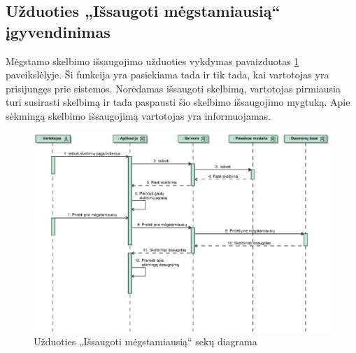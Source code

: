 \documentclass[12pt]{article}
\begin{document}
	\subsection{Užduoties „Išsaugoti mėgstamiausią“ įgyvendinimas}
	Mėgstamo skelbimo išsaugojimo užduoties vykdymas pavaizduotas \ref{SaveFavSeq} paveikslėlyje. Ši funkcija yra pasiekiama tada ir tik tada, kai vartotojas yra prisijungęs prie sistemos. Norėdamas išsaugoti skelbimą, vartotojas pirmiausia turi susirasti skelbimą ir tada  paspausti šio skelbimo išsaugojimo mygtuką. Apie sėkmingą skelbimo išsaugojimą vartotojas yra informuojamas.
	\begin{figure}[h]
		\begin{center}
			\includegraphics[width=\textwidth]{IssaugotiMegstamiausia.eps}
			\caption{Užduoties „Išsaugoti mėgstamiausią“ sekų diagrama\label{SaveFavSeq}}
		\end{center}
	\end{figure}
	
	
	\pagebreak
	
\end{document}
